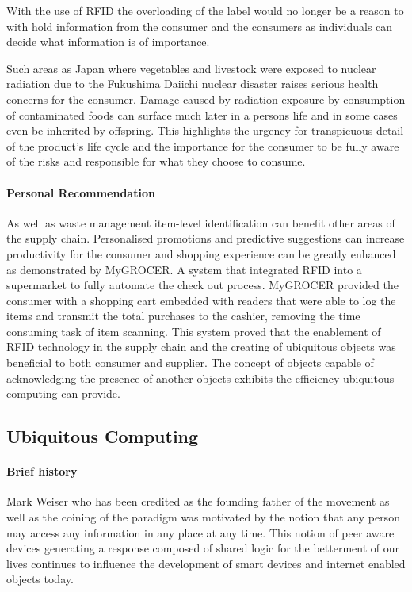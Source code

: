 \documentclass[a4paper, 11pt]{article}
\begin{document}
With the use of RFID the overloading of the label would no longer be a reason to with hold information from the consumer and the consumers as individuals can decide what information is of importance.

Such areas as Japan where vegetables and livestock were exposed to nuclear radiation due to the Fukushima Daiichi nuclear disaster raises serious health concerns for the consumer. Damage caused by radiation exposure by consumption of contaminated foods can surface much later in a persons life\cite{fukushima} and in some cases even be inherited by offspring. This highlights the urgency for transpicuous detail of the product's life cycle and the importance for the consumer to be fully aware of the risks and responsible for what they choose to consume.

\paragraph{Personal Recommendation} As well as waste management item-level identification can benefit other areas of the supply chain. Personalised promotions and predictive suggestions can increase productivity for the consumer and shopping experience can be greatly enhanced as demonstrated by MyGROCER\cite{myGrocer}. A system that integrated RFID into a supermarket to fully automate the check out process. MyGROCER provided the consumer with a shopping cart embedded with readers that were able to log the items and transmit the total purchases to the cashier, removing the time consuming task of item scanning. This system proved that the enablement of RFID technology in the supply chain and the creating of ubiquitous objects was beneficial to both consumer and supplier.\cite{pervasiveComp} The concept of objects capable of acknowledging the presence of another objects exhibits the efficiency ubiquitous computing can provide.

\vspace{\baselineskip}
\vspace{\baselineskip}
\vspace{\baselineskip}

\subsection{Ubiquitous Computing}

\paragraph{Brief history} Mark Weiser who has been credited as the founding father of the movement as well as the coining of the paradigm was motivated by the notion that any person may access any information in any place at any time.\cite{weiser} This notion of peer aware devices generating a response composed of shared logic for the betterment of our lives continues to influence the development of smart devices and internet enabled objects today.  
\end{document}
